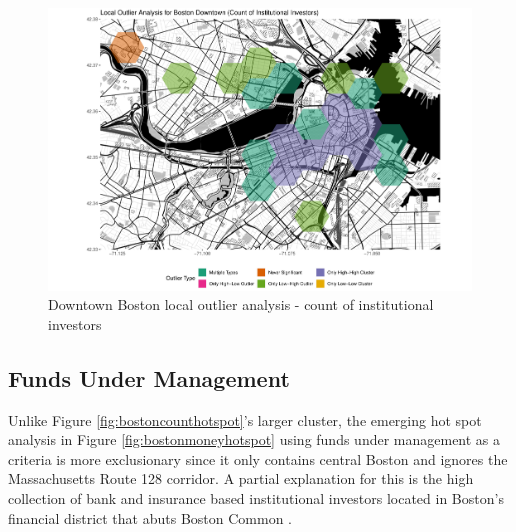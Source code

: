 \begin{figure}
	\centering
	\includegraphics[width=1\linewidth]{Figures/ChapterIV/Bos_Count_LO_Downtown}
	\caption[Downtown Boston Local Outlier Analysis - Count of Institutional Investors 1999-2018]{Downtown Boston local outlier analysis - count of institutional investors}
	\label{fig:bostoncountlocaloutliercount_Downtown}
\end{figure}


\subsection{Funds Under Management}

Unlike Figure \ref{fig:bostoncounthotspot}'s larger cluster, the emerging hot spot analysis in Figure \ref{fig:bostonmoneyhotspot} using funds under management as a criteria is more exclusionary since it only contains central Boston and ignores the Massachusetts Route 128 corridor.  A partial explanation for this is the high collection of bank and insurance based institutional investors located in Boston's financial district that abuts Boston Common .    	

